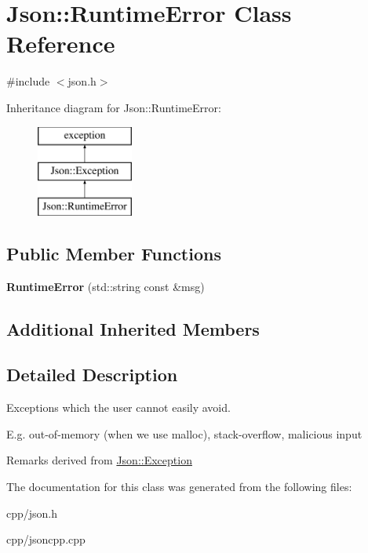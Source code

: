 \hypertarget{class_json_1_1_runtime_error}{}\section{Json\+:\+:Runtime\+Error Class Reference}
\label{class_json_1_1_runtime_error}


{\ttfamily \#include $<$json.\+h$>$}

Inheritance diagram for Json\+:\+:Runtime\+Error\+:\begin{figure}[H]
\begin{center}
\leavevmode
\includegraphics[height=3.000000cm]{class_json_1_1_runtime_error}
\end{center}
\end{figure}
\subsection*{Public Member Functions}
\begin{DoxyCompactItemize}
\item 
\mbox{\label{class_json_1_1_runtime_error_ae4f102d5c1efb773887efc8c7911e6f8}} 
{\bfseries Runtime\+Error} (std\+::string const \&msg)
\end{DoxyCompactItemize}
\subsection*{Additional Inherited Members}


\subsection{Detailed Description}
Exceptions which the user cannot easily avoid.

E.\+g. out-\/of-\/memory (when we use malloc), stack-\/overflow, malicious input

\begin{DoxyRemark}{Remarks}
derived from \hyperlink{class_json_1_1_exception}{Json\+::\+Exception} 
\end{DoxyRemark}


The documentation for this class was generated from the following files\+:\begin{DoxyCompactItemize}
\item 
cpp/json.\+h\item 
cpp/jsoncpp.\+cpp\end{DoxyCompactItemize}
